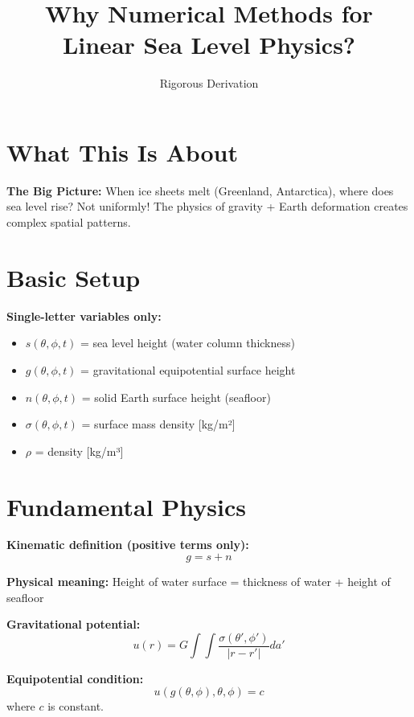 \documentclass{article}
\title{Why Numerical Methods for Linear Sea Level Physics?}
\author{Rigorous Derivation}
\date{}
\begin{document}
\maketitle

\section{What This Is About}

\textbf{The Big Picture:} When ice sheets melt (Greenland, Antarctica), where does sea level rise? Not uniformly! The physics of gravity + Earth deformation creates complex spatial patterns.

\section{Basic Setup}

\textbf{Single-letter variables only:}
\begin{itemize}
\item $s(\theta,\phi,t)$ = sea level height (water column thickness)
\item $g(\theta,\phi,t)$ = gravitational equipotential surface height
\item $n(\theta,\phi,t)$ = solid Earth surface height (seafloor)
\item $\sigma(\theta,\phi,t)$ = surface mass density [kg/m²]
\item $\rho$ = density [kg/m³]
\end{itemize}

\section{Fundamental Physics}

\textbf{Kinematic definition (positive terms only):}
\begin{equation}
g = s + n
\end{equation}

\textbf{Physical meaning:} Height of water surface = thickness of water + height of seafloor

\textbf{Gravitational potential:}
\begin{equation}
u(r) = G \int\int \frac{\sigma(\theta',\phi')}{|r-r'|} da'
\end{equation}

\textbf{Equipotential condition:}
\begin{equation}
u(g(\theta,\phi), \theta, \phi) = c
\end{equation}
where $c$ is constant.
\end{document}
